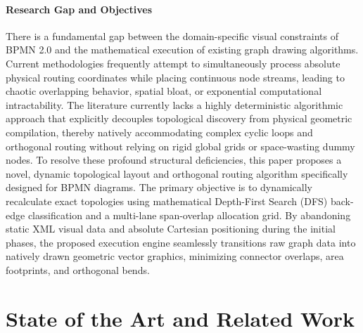 \documentclass[fleqn,10pt]{wlscirep}
\begin{document}
\paragraph{Research Gap and Objectives}
There is a fundamental gap between the domain-specific visual constraints of BPMN 2.0 and the mathematical execution of existing graph drawing algorithms. Current methodologies frequently attempt to simultaneously process absolute physical routing coordinates while placing continuous node streams, leading to chaotic overlapping behavior, spatial bloat, or exponential computational intractability. The literature currently lacks a highly deterministic algorithmic approach that explicitly decouples topological discovery from physical geometric compilation, thereby natively accommodating complex cyclic loops and orthogonal routing without relying on rigid global grids or space-wasting dummy nodes. To resolve these profound structural deficiencies, this paper proposes a novel, dynamic topological layout and orthogonal routing algorithm specifically designed for BPMN diagrams. The primary objective is to dynamically recalculate exact topologies using mathematical Depth-First Search (DFS) back-edge classification and a multi-lane span-overlap allocation grid. By abandoning static XML visual data and absolute Cartesian positioning during the initial phases, the proposed execution engine seamlessly transitions raw graph data into natively drawn geometric vector graphics, minimizing connector overlaps, area footprints, and orthogonal bends.

\section*{State of the Art and Related Work}
\end{document}
